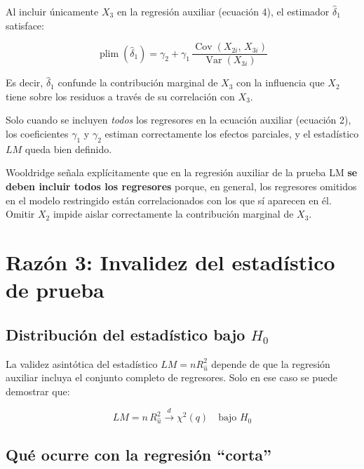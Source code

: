 \documentclass[12pt,letterpaper]{article}
\newcommand{\Var}{\operatorname{Var}}
\newcommand{\Cov}{\operatorname{Cov}}
\newcommand{\plim}{\operatorname{plim}}
\begin{document}
Al incluir únicamente $X_{3}$ en la regresión auxiliar (ecuación 4),
el estimador $\hat{\delta}_{1}$ satisface:

\begin{equation}
\plim(\hat{\delta}_{1})
= \gamma_{2} + \gamma_{1}\,\frac{\Cov(X_{2i},\, X_{3i})}{\Var(X_{3i})}
\end{equation}

Es decir, $\hat{\delta}_{1}$ confunde la contribución marginal de
$X_{3}$ con la influencia que $X_{2}$ tiene sobre los residuos a
través de su correlación con $X_{3}$.

Solo cuando se incluyen \emph{todos} los regresores en la ecuación
auxiliar (ecuación 2), los coeficientes $\gamma_{1}$ y $\gamma_{2}$
estiman correctamente los efectos parciales, y el estadístico $LM$
queda bien definido.

\begin{clave}
Wooldridge señala explícitamente que en la regresión auxiliar de la
prueba LM \textbf{se deben incluir todos los regresores} porque, en
general, los regresores omitidos en el modelo restringido están
correlacionados con los que sí aparecen en él. Omitir $X_{2}$ impide
aislar correctamente la contribución marginal de $X_{3}$.
\end{clave}

\section{Razón 3: Invalidez del estadístico de prueba}

\subsection{Distribución del estadístico bajo $H_{0}$}

La validez asintótica del estadístico $LM = n R^{2}_{\hat{u}}$ depende
de que la regresión auxiliar incluya el conjunto completo de regresores.
Solo en ese caso se puede demostrar que:

\begin{equation}
LM = n\,R^{2}_{\hat{u}} \xrightarrow{d} \chi^{2}(q)
\quad \text{bajo } H_{0}
\end{equation}

\subsection{Qué ocurre con la regresión ``corta''}
\end{document}
